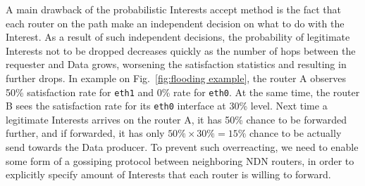 A main drawback of the probabilistic Interests accept method is the fact that each router on the path make an independent decision on what to do with the Interest.
As a result of such independent decisions, the probability of legitimate Interests not to be dropped decreases quickly as the number of hops between the requester and Data grows, worsening the satisfaction statistics and resulting in further drops.
In example on Fig.~\ref{fig:flooding example}, the router A observes 50\% satisfaction rate for \texttt{eth1} and 0\% rate for \texttt{eth0}. 
At the same time, the router B sees the satisfaction rate for its \texttt{eth0} interface at 30\% level.
Next time a legitimate Interests arrives on the router A, it has 50\% chance to be forwarded further, and if forwarded, it has only $50\% \times 30\% = 15\%$ chance to be actually send towards the Data producer.
To prevent such overreacting, we need to enable some form of a gossiping protocol between neighboring NDN routers, in order to explicitly specify amount of Interests that each router is willing to forward.

